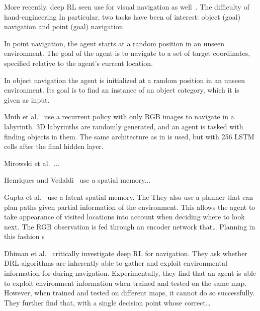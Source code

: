 More recently, deep RL seen use for visual navigation as well~\cite{zeng_survey_2020}.
The difficulty of hand-engineering 
In particular, two tasks have been of interest: object (goal) navigation and point (goal) navigation.

In point navigation, the agent starts at a random position in an unseen environment.
The goal of the agent is to navigate to a set of target coordinates, specified relative to the agent's current location.

In object navigation the agent is initialized at a random position in an unseen environment.
Its goal is to find an instance of an object category, which it is given as input.


Mnih et al.~\cite{mnih_asynchronous_2016} use a recurrent policy with only RGB images to navigate in a labyrinth.
3D labyrinths are randomly generated, and an agent is tasked with finding objects in them.
The same architecture as in \cite{mnih_human_2015} is used, but with 256 LSTM cells after the final hidden layer.



Mirowski et al.~\cite{mirowski_navigate_2017}...

Henriques and Vedaldi~\cite{henriques_vedaldi_2018} use a spatial memory...

Gupta et al.~\cite{gupta_cognitive_2019} use a latent spatial memory.
The 
They also use a planner that can plan paths given partial information of the environment.
This allows the agent to take appearance of visited locations into account when deciding where to look next.
The RGB observation is fed through an encoder network that\dots
Planning in this fashion s

Dhiman et al.~\cite{dhiman_critical_2019} critically investigate deep RL for navigation.
They ask whether DRL algorithms are inherently able to gather and exploit environmental information for during navigation.
Experimentally, they find that an agent is able to exploit environment information when trained and tested on the same map.
However, when trained and tested on different maps, it cannot do so successfully.
They further find that, with a single decision point whose correct\dots

